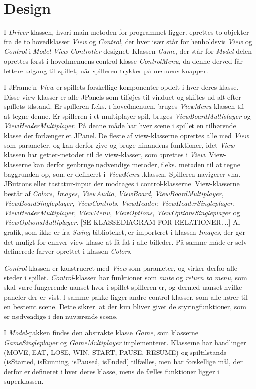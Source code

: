 
\section{Design}
I \textit{Driver}-klassen, hvori main-metoden for programmet ligger, oprettes to objekter fra de to hovedklasser \textit{View} og \textit{Control}, der hver især står for henholdsvis \textit{View} og \textit{Control} i \textit{Model-View-Controller}-designet. Klassen \textit{Game}, der står for \textit{Model}-delen oprettes først i hovedmenuens control-klasse \textit{ControlMenu}, da denne derved får lettere adgang til spillet, når spilleren trykker på menuens knapper. 

I JFrame'n \textit{View} er spillets forskellige komponenter opdelt i hver deres klasse. Disse view-klasser er alle JPanels som tilføjes til vinduet og skiftes ud alt efter spillets tilstand. Er spilleren f.eks. i hovedmenuen, bruges \textit{ViewMenu}-klassen til at tegne denne. Er spilleren i et multiplayer-spil, bruges \textit{ViewBoardMultiplayer} og \textit{ViewHeaderMultiplayer}. På denne måde har hver scene i spillet en tilhørende klasse der forlænger et JPanel. De fleste af view-klasserne oprettes alle med \textit{View} som parameter, og kan derfor give og bruge hinandens funktioner, idet \textit{View}-klassen har getter-metoder til de view-klasser, som oprettes i \textit{View}. View-klasserne kan derfor genbruge nødvendige metoder, f.eks. metoden til at tegne baggrunden op, som er defineret i \textit{ViewMenu}-.klassen. Spilleren navigerer vha. JButtons eller tastatur-input der modtages i control-klasserne.
View-klasserne består af \textit{Colors}, \textit{Images}, \textit{ViewAudio}, \textit{ViewBoard}, \textit{ViewBoardMultiplayer}, \textit{ViewBoardSingleplayer}, \textit{ViewControls}, \textit{ViewHeader}, \textit{ViewHeaderSingleplayer}, \textit{ViewHeaderMultiplayer}, \textit{ViewMenu}, \textit{ViewOptions}, \textit{ViewOptionsSingleplayer} og \textit{ViewOptionsMultiplayer}. [SE KLASSEDIAGRAM FOR RELATIONER....]
Al grafik, som ikke er fra \textit{Swing}-biblioteket, er importeret i klassen \textit{Images}, der gør det muligt for enhver view-klasse at få fat i alle billeder. På samme måde er selv-definerede farver oprettet i klassen \textit{Colors}.

\textit{Control}-klassen er konstrueret med \textit{View} som parameter, og virker derfor alle steder i spillet. \textit{Control}-klassen har funktioner som \textit{mute} og \textit{return to menu}, som skal være fungerende uanset hvor i spillet spilleren er, og dermed uanset hvilke paneler der er vist. I samme pakke ligger andre control-klasser, som alle hører til en bestemt scene. Dette sikrer, at der kun bliver givet de styringfunktioner, som er nødvendige i den nuværende scene.

I \textit{Model}-pakken findes den abstrakte klasse \textit{Game}, som klasserne \textit{GameSingleplayer} og \textit{GameMultiplayer} implementerer. Klasserne har handlinger (MOVE, EAT, LOSE, WIN, START, PAUSE, RESUME) og spiltilstande (isStarted, isRunning, isPaused, isEnded) tilfælles, men har forskellige mål, der derfor er defineret i hver deres klasse, mens de fælles funktioner ligger i superklassen.